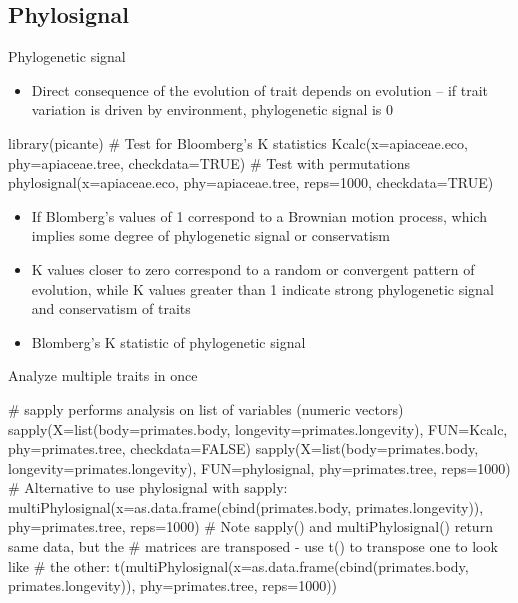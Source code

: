\documentclass[compress, ucs, xelatex, 11pt, xcolor=svgnames,
  hyperref={
    bookmarks=true,
    unicode=true,
    colorlinks=true,
    pdftitle={Molecular data in R},
    plainpages=false,
    pdfauthor={Vojtech Zeisek},
    pdfsubject={Course about phylogeny and evolution in R},
    pdfcreator={XeLaTeX},
    pdfkeywords={R, evolution, phylogeny, molecular data},
    linkcolor=Tomato,
    anchorcolor=SaddleBrown,
    citecolor=Goldenrod,
    filecolor=DarkMagenta,
    menucolor=Sienna,
    urlcolor=DarkTurquoise,
    pdftex},
  url={hyphens, lowtilde} %
  ]{beamer}
\begin{document}
\subsection{Phylosignal}

\begin{frame}[fragile]{Phylogenetic signal}
  \begin{itemize}
    \item Direct consequence of the evolution of trait depends on evolution -- if trait variation is driven by environment, phylogenetic signal is 0
  \end{itemize}
\begin{spluscode}
    library(picante)
    # Test for Bloomberg's K statistics
    Kcalc(x=apiaceae.eco, phy=apiaceae.tree, checkdata=TRUE)
    # Test with permutations
    phylosignal(x=apiaceae.eco, phy=apiaceae.tree, reps=1000,
      checkdata=TRUE)
  \end{spluscode}
  \begin{itemize}
    \item If Blomberg's values of 1 correspond to a Brownian motion process, which implies some degree of phylogenetic signal or conservatism
    \item K values closer to zero correspond to a random or convergent pattern of evolution, while K values greater than 1 indicate strong phylogenetic signal and conservatism of traits
    \item Blomberg's K statistic of phylogenetic signal
  \end{itemize}
\end{frame}

\begin{frame}[fragile]{Analyze multiple traits in once}
  \begin{spluscode}
    # sapply performs analysis on list of variables (numeric vectors)
    sapply(X=list(body=primates.body, longevity=primates.longevity),
      FUN=Kcalc, phy=primates.tree, checkdata=FALSE)
    sapply(X=list(body=primates.body, longevity=primates.longevity),
      FUN=phylosignal, phy=primates.tree, reps=1000)
    # Alternative to use phylosignal with sapply:
    multiPhylosignal(x=as.data.frame(cbind(primates.body,
      primates.longevity)), phy=primates.tree, reps=1000)
    # Note sapply() and multiPhylosignal() return same data, but the
    # matrices are transposed - use t() to transpose one to look like
    # the other:
    t(multiPhylosignal(x=as.data.frame(cbind(primates.body,
      primates.longevity)), phy=primates.tree, reps=1000))
  \end{spluscode}
\end{frame}
\end{document}
